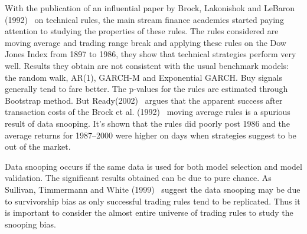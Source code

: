 With the publication of an influential paper by Brock, Lakonishok and LeBaron (1992)~\cite{BLL} on technical rules, the main stream finance academics started paying attention to studying the properties of these rules. The rules considered are moving average and trading range break and applying these rules on the Dow Jones Index from 1897 to 1986, they show that technical strategies perform very well. Results they obtain are not consistent with the usual benchmark models: the random walk, AR(1), GARCH-M and Exponential GARCH. Buy signals generally tend to fare better. The p-values for the rules are estimated through Bootstrap method. But Ready(2002)~\cite{ready} argues that the apparent success after transaction costs of the Brock et al. (1992)~\cite{BLL} moving average rules is a spurious result of data snooping. It's shown that the rules did poorly post 1986 and the average returns for 1987--2000 were higher on days when strategies suggest to be out of the market.


Data snooping occurs if the same data is used for both model selection and model validation. The significant results obtained can be due to pure chance. As Sullivan, Timmermann and White (1999)~\cite{sullivan1999data} suggest the data snooping may be due to survivorship bias as only successful trading rules tend to be replicated. Thus it is important to consider the almost entire universe of trading rules to study the snooping bias.


